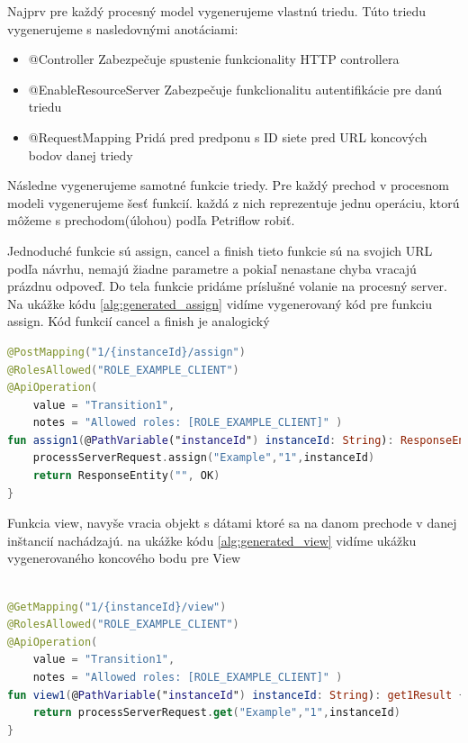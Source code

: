Najprv pre každý procesný model vygenerujeme vlastnú triedu. Túto triedu vygenerujeme s nasledovnými anotáciami: 

\begin{itemize} 
	\item @Controller Zabezpečuje spustenie funkcionality HTTP controllera  
	\item @EnableResourceServer Zabezpečuje funkclionalitu autentifikácie pre danú triedu 
	\item @RequestMapping Pridá pred predponu s ID siete pred URL koncových bodov danej triedy 
\end{itemize} 

Následne vygenerujeme samotné funkcie triedy. Pre každý prechod v procesnom modeli vygenerujeme šesť funkcií. každá z nich reprezentuje jednu operáciu, ktorú môžeme s prechodom(úlohou) podľa Petriflow robiť.  

Jednoduché funkcie sú assign, cancel a finish tieto funkcie sú na svojich URL podľa návrhu, nemajú žiadne parametre a pokiaľ nenastane chyba vracajú prázdnu odpoveď. Do tela funkcie pridáme príslušné volanie na procesný server. Na ukážke kódu \ref{alg:generated_assign} vidíme vygenerovaný kód pre funkciu assign. Kód funkcií cancel a finish je analogický  



\begin{lstlisting}[float, caption={Príklad vygenerovanej funkcie},label={alg:generated_assign},language=Kotlin] 
@PostMapping("1/{instanceId}/assign") 
@RolesAllowed("ROLE_EXAMPLE_CLIENT") 
@ApiOperation( 
	value = "Transition1", 
	notes = "Allowed roles: [ROLE_EXAMPLE_CLIENT]" ) 
fun assign1(@PathVariable("instanceId") instanceId: String): ResponseEntity<String> { 
	processServerRequest.assign("Example","1",instanceId) 
	return ResponseEntity("", OK) 
} 
\end{lstlisting} 

Funkcia view, navyše vracia objekt s dátami ktoré sa na danom prechode v danej inštancií nachádzajú. na ukážke kódu \ref{alg:generated_view} vidíme ukážku vygenerovaného koncového bodu pre View 


\begin{lstlisting}[float, caption={Príklad vygenerovanej funkcie},label={alg:generated_view},language=Kotlin] 

@GetMapping("1/{instanceId}/view") 
@RolesAllowed("ROLE_EXAMPLE_CLIENT") 
@ApiOperation( 
	value = "Transition1", 
	notes = "Allowed roles: [ROLE_EXAMPLE_CLIENT]" ) 
fun view1(@PathVariable("instanceId") instanceId: String): get1Result { 
	return processServerRequest.get("Example","1",instanceId) 
} 
\end{lstlisting} 



